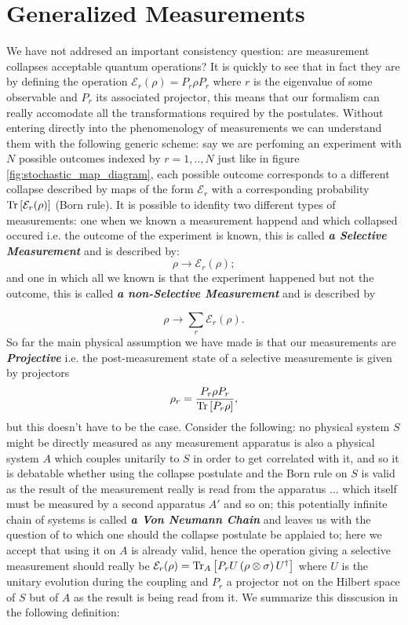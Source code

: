 \section{Generalized Measurements}
We have not addresed an important consistency question: are measurement collapses acceptable quantum operations? It is quickly to see that
in fact they are by defining the operation $\mathcal{E}_{r}(\rho)=P_{r}\rho P_{r}$ where $r$ is the eigenvalue of some observable and $P_{r}$ its
associated projector, this means that our formalism can really accomodate all the transformations required by the postulates. Without entering
directly into the phenomenology of measurements we can understand them with the following generic scheme: say we are perfoming an experiment
with $N$ possible outcomes indexed by ${r=1,..,N}$ just like in figure \ref{fig:stochastic_map_diagram}, each possible outcome corresponds to a
different collapse described by maps of the form $\mathcal{E}_{r}$ with a corresponding probability $\mathrm{Tr}\left[\mathcal{E}_{r}(\rho)\right]$ (Born rule).
It is possible to idenfity two different types of measurements: one when we known a measurement happend and which collapsed occured i.e.
the outcome of the experiment is known, this is  called  \textit{\textbf{a Selective Measurement}} \cite{diosi_short_2011}
and is described by:
\begin{equation}
\rho \to \mathcal{E}_{r}(\rho);
\end{equation}
and one in which all we known is that the experiment happened but not the outcome, this is called \textit{\textbf{a non-Selective Measurement}}
\cite{diosi_short_2011} and is described by

\begin{equation}
\rho \to \sum_{r}\mathcal{E}_{r}(\rho).
\end{equation}
So far the main physical assumption we have made is that our measurements are \textbf{\textit{Projective}} i.e. the post-measurement state
of a selective measuremente is given by projectors
\begin{equation}
\rho_{r} = \frac{P_{r}\rho P_{r}}{\mathrm{Tr}\left[P_{r}\rho\right]},
\end{equation}
but this doesn't have to be the case. Consider the following: no physical system $S$ might be directly measured as any measurement apparatus is
also a physical system $A$ which couples unitarily to $S$ in order to get correlated with it, and so it is debatable whether using the collapse postulate and the Born rule on $S$ is valid as the
result of the measurement really is read from the apparatus ... which itself must be measured by a second apparatus $A'$ and so on; this
potentially infinite chain of systems is called \textbf{\textit{a Von Neumann Chain}} and leaves us with the question of to which one should the
collapse postulate be applaied to; here we accept that using it on $A$ is already valid, hence the operation giving a selective measurement
should really be $\mathcal{E}_{r}(\rho) = \mathrm{Tr}_{A}\left[P_{r} U\left(\rho\otimes\sigma \right)U^{\dagger}\right]$ where $U$ is the unitary evolution during
the coupling and $P_{r}$ a projector not on the Hilbert space of $S$ but of $A$ as the result is being read from it. We summarize this disscusion
in the following definition:

